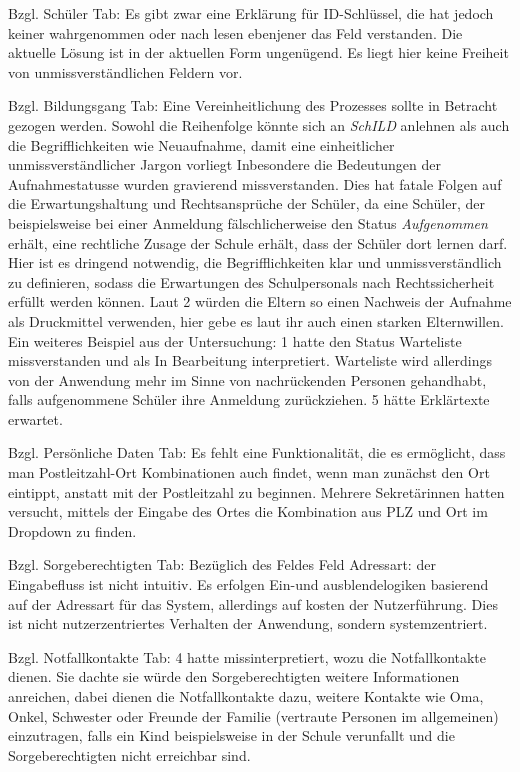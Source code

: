 Bzgl. Schüler Tab: Es gibt zwar eine Erklärung für ID-Schlüssel, die hat jedoch keiner wahrgenommen oder nach lesen ebenjener das Feld verstanden. Die aktuelle Lösung ist in der aktuellen Form ungenügend. Es liegt hier keine Freiheit von unmissverständlichen Feldern vor.

Bzgl. Bildungsgang Tab:
Eine Vereinheitlichung des Prozesses sollte in Betracht gezogen werden. Sowohl die Reihenfolge könnte sich an \textit{SchILD} anlehnen als auch die Begrifflichkeiten wie Neuaufnahme, damit eine einheitlicher unmissverständlicher Jargon vorliegt
Inbesondere die Bedeutungen der Aufnahmestatusse wurden gravierend missverstanden. Dies hat fatale Folgen auf die Erwartungshaltung und Rechtsansprüche der Schüler, da eine Schüler, der beispielsweise bei einer Anmeldung fälschlicherweise den Status \textit{Aufgenommen} erhält, eine rechtliche Zusage der Schule erhält, dass der Schüler dort lernen darf. Hier ist es dringend notwendig, die Begrifflichkeiten klar und unmissverständlich zu definieren, sodass die Erwartungen des Schulpersonals nach Rechtssicherheit erfüllt werden können. Laut 2 würden die Eltern so einen Nachweis der Aufnahme als \glqq Druckmittel\grqq{} verwenden, hier gebe es laut ihr auch einen starken Elternwillen.
Ein weiteres Beispiel aus der Untersuchung:  1 hatte den Status Warteliste missverstanden und als \glqq In Bearbeitung\grqq{} interpretiert. Warteliste wird allerdings von der Anwendung mehr im Sinne von nachrückenden Personen gehandhabt, falls aufgenommene Schüler ihre Anmeldung zurückziehen. 5 hätte Erklärtexte erwartet. 

Bzgl. Persönliche Daten Tab:
Es fehlt eine Funktionalität, die es ermöglicht, dass man Postleitzahl-Ort Kombinationen auch findet, wenn man zunächst den Ort eintippt, anstatt mit der Postleitzahl zu beginnen. Mehrere Sekretärinnen hatten versucht, mittels der Eingabe des Ortes die Kombination aus PLZ und Ort im Dropdown zu finden.

Bzgl. Sorgeberechtigten Tab:
Bezüglich des Feldes Feld Adressart: der Eingabefluss ist nicht intuitiv. Es erfolgen Ein-und ausblendelogiken basierend auf der Adressart für das System, allerdings auf kosten der Nutzerführung. Dies ist nicht nutzerzentriertes Verhalten der Anwendung, sondern systemzentriert. 

Bzgl. Notfallkontakte Tab:
4 hatte missinterpretiert, wozu die Notfallkontakte dienen. Sie dachte sie würde den Sorgeberechtigten weitere Informationen anreichen, dabei dienen die Notfallkontakte dazu, weitere Kontakte wie Oma, Onkel, Schwester oder Freunde der Familie (vertraute Personen im allgemeinen) einzutragen, falls ein Kind beispielsweise in der Schule verunfallt und die Sorgeberechtigten nicht erreichbar sind.

